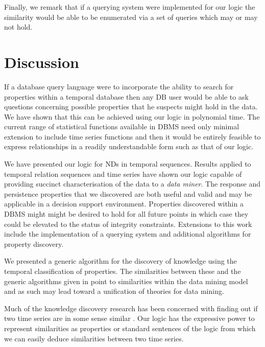 Finally, we remark that if a querying system were implemented for our
logic the similarity would be able to be enumerated via a set of
queries which may or may not hold.

\section{Discussion}\label{sec:tr_disc}



If a database query language were to incorporate the ability to search
for properties within a temporal database then any DB user would be
able to ask questions concerning possible properties that he suspects
might hold in the data. We have shown that this can be achieved using
our logic in polynomial time. The current range of statistical
functions available in DBMS need only minimal extension to include time
series functions and then it would be entirely feasible to express
relationships in a readily understandable form such as that of our
logic.
 
\medskip
 
We have presented our logic for NDs in temporal sequences. Results
applied to temporal relation sequences and time series have shown our
logic capable of providing succinct characterisation of the data to a
{\em data miner}. The response and persistence properties that we discovered are both useful and
valid and may be applicable in a decision support
environment. Properties discovered within a DBMS might might be
desired to hold for all future points in which case they could be
elevated to the status of integrity constraints. 
Extensions to this work include the implementation of a
querying system and additional algorithms for property discovery.

\medskip
We presented a generic algorithm for the discovery of knowledge using
the temporal classification of properties. The similarities between
these and the generic algorithms given in \cite{man96,man97} point to
similarities within the data mining model and as such may lead toward
a unification of theories for data mining. 
\medskip 

Much of the knowledge discovery research has been concerned with
finding out if two time series are in some sense similar
\cite{frm94,alss95}. Our logic has the expressive power to represent
similarities as properties or standard sentences of the logic from
which we can easily deduce similarities between two time series.
